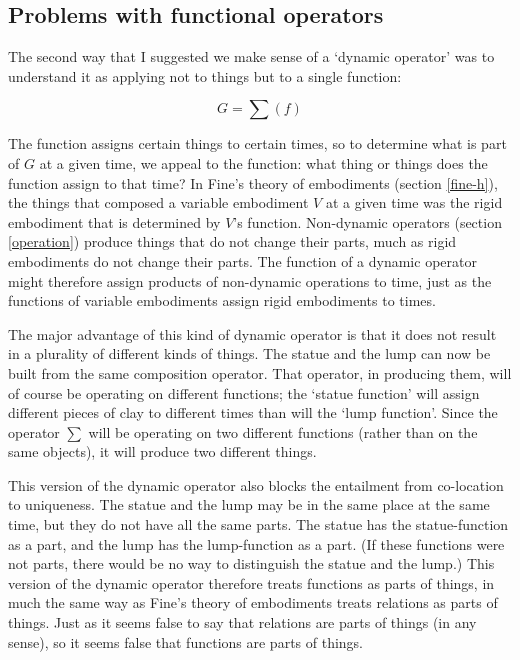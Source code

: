 \documentclass[11pt]{article}
\begin{document}
\begin{spacing}{1.5}
\subsection{Problems with functional operators}
\label{problems2b}
The second way that I suggested we make sense of a `dynamic operator'
was to understand it as applying not to things but to a single
function:

\begin{displaymath}
G = \sum ( f )
\end{displaymath}

The function assigns certain things to certain times, so to determine
what is part of $G$ at a given time, we appeal to the function: what
thing or things does the function assign to that time?  In Fine's
theory of embodiments (section \ref{fine-h}), the things that composed
a variable embodiment $V$ at a given time was the rigid embodiment
that is determined by $V$'s function.  Non-dynamic operators (section
\ref{operation}) produce things that do not change their parts, much
as rigid embodiments do not change their parts.  The function of a
dynamic operator might therefore assign products of non-dynamic
operations to time, just as the functions of variable embodiments
assign rigid embodiments to times.

The major advantage of this kind of dynamic operator is that it does
not result in a plurality of different kinds of things.  The statue
and the lump can now be built from the same composition operator.
That operator, in producing them, will of course be operating on
different functions; the `statue function' will assign different
pieces of clay to different times than will the `lump function'.
Since the operator $\sum$ will be operating on two different functions
(rather than on the same objects), it will produce two different
things.

This version of the dynamic operator also blocks the entailment from
co-location to uniqueness.  The statue and the lump may be in the same
place at the same time, but they do not have all the same parts.  The
statue has the statue-function as a part, and the lump has the
lump-function as a part.  (If these functions were not parts, there
would be no way to distinguish the statue and the lump.)  This version
of the dynamic operator therefore treats functions as parts of things,
in much the same way as Fine's theory of embodiments treats relations
as parts of things.  Just as it seems false to say that relations are
parts of things (in any sense), so it seems false that functions are
parts of things.


\end{spacing}
\end{document}
